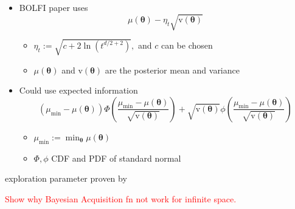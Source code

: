 \begin{itemize}
    \item BOLFI paper uses $$\mu(\bm\theta) - \eta_t\sqrt{\mathrm{v}(\bm\theta)}$$ \begin{itemize}
              \item $\eta_t:= \sqrt{c + 2\ln(t^{d/2 + 2})},$ and $c$ can be chosen
              \item $\mu(\bm\theta)$ and $\mathrm{v}(\bm\theta)$ are the posterior mean and variance
          \end{itemize}

    \item Could use expected information
          $$
              (\mu_\text{min} - \mu(\bm\theta)) \varPhi \left(
              \frac{\mu_\text{min} - \mu(\bm\theta)}{\sqrt{\mathrm{v}(\bm\theta)}}
              \right)
              + \sqrt{\mathrm{v}(\bm\theta)}\phi\left(
              \frac{\mu_\text{min} - \mu(\bm\theta)}{\sqrt{\mathrm{v}(\bm\theta)}}
              \right)
          $$
          \begin{itemize}
              \item $\mu_\text{min} := \min_{\bm{\theta}} \mu(\bm\theta)$
              \item $\varPhi, \phi$ CDF and PDF of standard normal
          \end{itemize}
\end{itemize}
exploration parameter proven by \cite{srinivas_gaussian_2010}

\textcolor{red}{Show why Bayesian Acquisition fn not work for infinite space.}